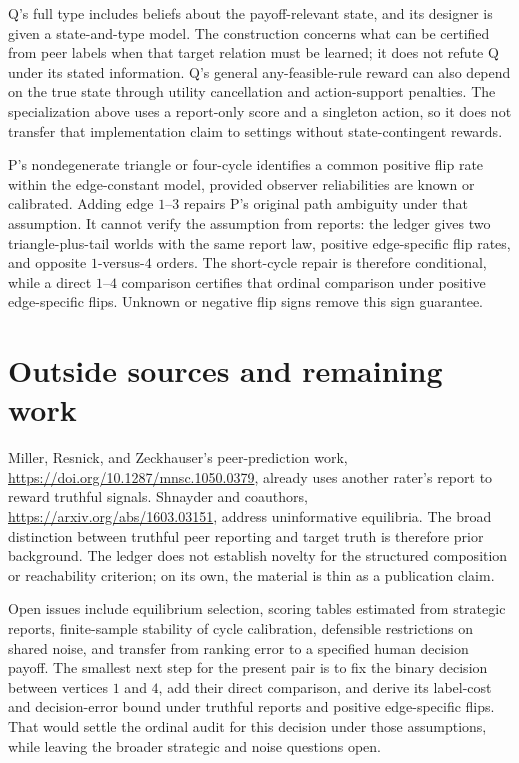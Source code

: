 \documentclass{article}
\begin{document}
Q's full type includes beliefs about the payoff-relevant state, and its
designer is given a state-and-type model. The construction concerns what
can be certified from peer labels when that target relation must be learned;
it does not refute Q under its stated information. Q's general
any-feasible-rule reward can also depend on the true state through utility
cancellation and action-support penalties. The specialization above uses a
report-only score and a singleton action, so it does not transfer that
implementation claim to settings without state-contingent rewards.

P's nondegenerate triangle or four-cycle identifies a common positive flip
rate within the edge-constant model, provided observer reliabilities are
known or calibrated. Adding edge \(1\)--\(3\) repairs P's original path
ambiguity under that assumption. It cannot verify the assumption from
reports: the ledger gives two triangle-plus-tail worlds with the same
report law, positive edge-specific flip rates, and opposite \(1\)-versus-\(4\)
orders. The short-cycle repair is therefore conditional, while a direct
\(1\)--\(4\) comparison certifies that ordinal comparison under positive
edge-specific flips. Unknown or negative flip signs remove this sign
guarantee. 

\section{Outside sources and remaining work}

Miller, Resnick, and Zeckhauser's peer-prediction work,
\url{https://doi.org/10.1287/mnsc.1050.0379}, already uses another rater's
report to reward truthful signals. Shnayder and coauthors,
\url{https://arxiv.org/abs/1603.03151}, address uninformative equilibria.
The broad distinction between truthful peer reporting and target truth is
therefore prior background. The ledger does not establish novelty for the
structured composition or reachability criterion; on its own, the material
is thin as a publication claim. 

Open issues include equilibrium selection, scoring tables estimated from
strategic reports, finite-sample stability of cycle calibration, defensible
restrictions on shared noise, and transfer from ranking error to a specified
human decision payoff. The smallest next step for the present pair is to
fix the binary decision between vertices \(1\) and \(4\), add their direct
comparison, and derive its label-cost and decision-error bound under
truthful reports and positive edge-specific flips. That would settle the
ordinal audit for this decision under those assumptions, while leaving the
broader strategic and noise questions open. 
\end{document}
